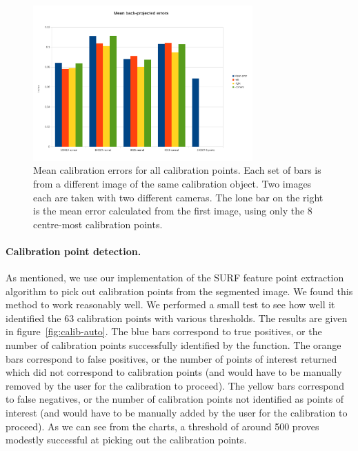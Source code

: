 \begin{figure}[htb]
  \centering
  \includegraphics[width=0.75\textwidth]{figures/calibration-means}
  \caption[Mean calibration errors]{Mean calibration errors for all
    calibration points. Each set of bars is from a different image of
    the same calibration object. Two images each are taken with two
    different cameras. The lone bar on the right
    is the mean error calculated from the first image, using only
    the 8 centre-most calibration points.}
  \label{fig:calib-errors}
\end{figure}

\paragraph{Calibration point detection.}
As mentioned, we use our implementation of the SURF feature point extraction algorithm to pick out calibration points from the segmented image. We found this method to work reasonably well. We performed a small test to see how well it identified the 63 calibration points with various thresholds. The results are given in figure~\ref{fig:calib-auto}. The blue bars correspond to true positives, or the number of calibration points successfully identified by the function. The orange bars correspond to false positives, or the number of points of interest returned which did not correspond to calibration points (and would have to be manually removed by the user for the calibration to proceed). The yellow bars correspond to false negatives, or the number of calibration points not identified as points of interest (and would have to be manually added by the user for the calibration to proceed). As we can see from the charts, a threshold of around 500 proves modestly successful at picking out the calibration points.

